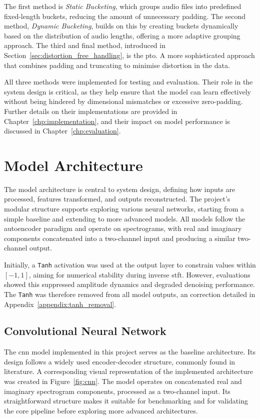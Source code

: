 The first method is \textit{Static Bucketing}, which groups audio files into predefined fixed-length buckets, reducing the amount of unnecessary padding. The second method, \textit{Dynamic Bucketing}, builds on this by creating buckets dynamically based on the distribution of audio lengths, offering a more adaptive grouping approach. The third and final method, introduced in Section~\ref{sec:distortion_free_handling}, is the \gls{pto}. A more sophisticated approach that combines padding and truncating to minimise distortion in the data.

All three methods were implemented for testing and evaluation. Their role in the system design is critical, as they help ensure that the model can learn effectively without being hindered by dimensional mismatches or excessive zero-padding. Further details on their implementations are provided in Chapter~\ref{chp:implementation}, and their impact on model performance is discussed in Chapter~\ref{chp:evaluation}.

\section{Model Architecture}
\label{sec:model_architecture}

The model architecture is central to system design, defining how inputs are processed, features transformed, and outputs reconstructed. The project’s modular structure supports exploring various neural networks, starting from a simple baseline and extending to more advanced models. All models follow the autoencoder paradigm and operate on spectrograms, with real and imaginary components concatenated into a two-channel input and producing a similar two-channel output.

Initially, a \texttt{Tanh} activation was used at the output layer to constrain values within $[-1, 1]$, aiming for numerical stability during inverse \gls{stft}. However, evaluations showed this suppressed amplitude dynamics and degraded denoising performance. The \texttt{Tanh} was therefore removed from all model outputs, an correction detailed in Appendix~\ref{appendix:tanh_removal}.

\subsection{Convolutional Neural Network}
\label{sec:cnn}

The \gls{cnn} model implemented in this project serves as the baseline architecture. Its design follows a widely used encoder-decoder structure, commonly found in literature. A corresponding visual representation of the implemented architecture was created in Figure~\ref{fig:cnn}. The model operates on concatenated real and imaginary spectrogram components, processed as a two-channel input. Its straightforward structure makes it suitable for benchmarking and for validating the core pipeline before exploring more advanced architectures.

